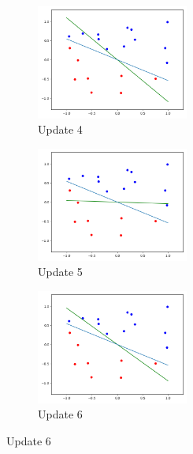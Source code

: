 \documentclass[12pt,letterpaper]{article}
\begin{document}
\begin{enumerate}[leftmargin=!,labelindent=5pt]
\begin{figure}[H]
        \begin{subfigure}{0.3\textwidth}
        \includegraphics[width=5cm]{images/b6.png} 
        \caption{Update 4}
        \label{fig:subim4}
        \end{subfigure}
        \begin{subfigure}{0.3\textwidth}
        \includegraphics[width=5cm]{images/b7.png}
        \caption{Update 5}
        \label{fig:subim5}
        \end{subfigure}
        \begin{subfigure}{0.3\textwidth}
        \includegraphics[width=5cm]{images/b8.png}
        \caption{Update 6}
        \label{fig:subim6}
        \end{subfigure}
        

\end{figure}
\end{enumerate}
\end{document}
